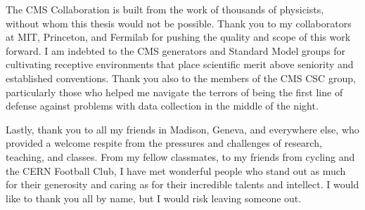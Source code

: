 The CMS Collaboration is built from the work of thousands of physicists,
without whom this thesis would not be possible. Thank you to
my collaborators at MIT, Princeton, and Fermilab for pushing the quality
and scope of this work forward.
I am indebted to the CMS generators and Standard Model groups 
for cultivating receptive environments that place scientific merit above
seniority and established conventions.
Thank you also to the members of the CMS CSC group, particularly those
who helped me navigate the terrors of being the first line of defense
against problems with data collection in the middle of the night.

Lastly, thank you to all my friends in Madison, Geneva,
and everywhere else,
who provided a welcome respite from the pressures and challenges of
research, teaching, and classes. From my fellow classmates, to my friends from cycling and
the CERN Football Club, I have met wonderful people who stand out
as much for their generosity and caring as for their incredible talents
and intellect. I would like to thank you all by name, but I would
risk leaving someone out.

